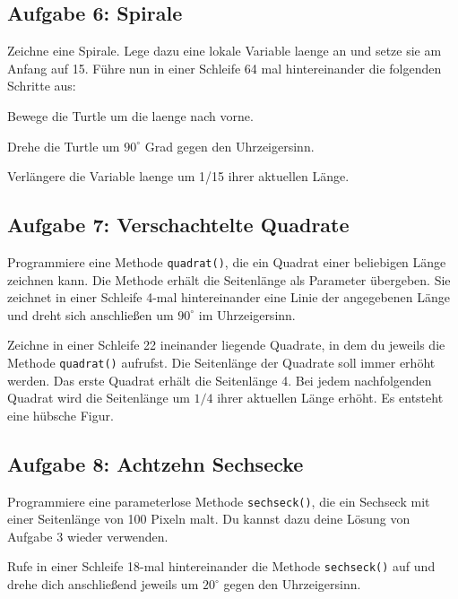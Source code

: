  
\subsection{Aufgabe 6: Spirale}

Zeichne eine Spirale. Lege dazu eine lokale Variable laenge an und setze sie am
Anfang auf 15. Führe nun in einer Schleife 64 mal hintereinander die folgenden
Schritte aus:

\begin{compactitem}
\item Bewege die Turtle um die laenge nach vorne.
\item Drehe die Turtle um $90^\circ$ Grad gegen den Uhrzeigersinn.
\item Verlängere die Variable laenge um 1/15 ihrer aktuellen Länge.
\end{compactitem}


\subsection{Aufgabe 7: Verschachtelte Quadrate}

\begin{compactenum}[a)]
\item Programmiere eine Methode \verb|quadrat()|, die ein Quadrat einer
beliebigen Länge zeichnen kann. Die Methode erhält die Seitenlänge als
Parameter übergeben. Sie zeichnet in einer Schleife 4-mal hintereinander eine
Linie der angegebenen Länge und dreht sich anschließen um $90^\circ$ im
Uhrzeigersinn.

\item Zeichne in einer Schleife 22 ineinander liegende Quadrate, in dem du
jeweils die Methode \verb|quadrat()| aufrufst. Die Seitenlänge der Quadrate soll
immer erhöht werden. Das erste Quadrat erhält die Seitenlänge 4. Bei jedem
nachfolgenden Quadrat wird die Seitenlänge um $1/4$ ihrer aktuellen Länge
erhöht. Es entsteht eine hübsche Figur.
\end{compactenum}


\subsection{Aufgabe 8: Achtzehn Sechsecke}

\begin{compactenum}[a)]
\item Programmiere eine parameterlose Methode \verb|sechseck()|, die ein
Sechseck mit einer Seitenlänge von 100 Pixeln malt. Du kannst dazu deine Lösung
von Aufgabe 3 wieder verwenden.

\item Rufe in einer Schleife 18-mal hintereinander die Methode \verb|sechseck()|
auf und drehe dich anschließend jeweils um $20^\circ$ gegen den Uhrzeigersinn.
\end{compactenum}


